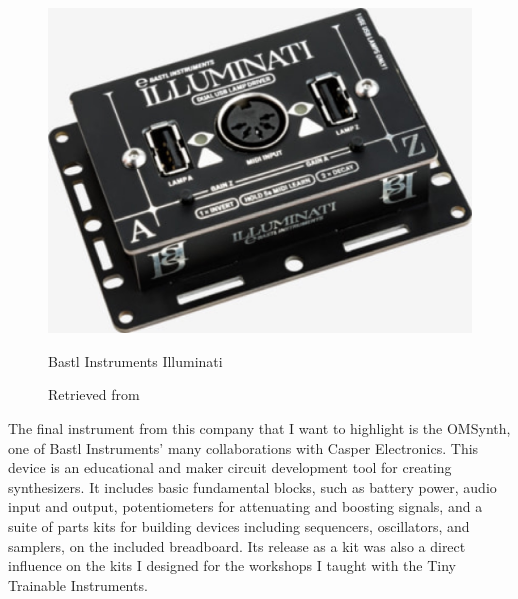 \begin{figure}[ht]
  \centering
  \includegraphics[width=0.75\linewidth,height=0.25\textheight,keepaspectratio]{images/bastl-illuminati.jpg}
  \caption{Bastl Instruments Illuminati}
  \caption*{Retrieved from \cite{website-bastl-instruments-current}}
  \label{fig:bastl-illuminati}
\end{figure}

The final instrument from this company that I want to highlight is the OMSynth, one of Bastl Instruments' many collaborations with Casper Electronics. This device is an educational and maker circuit development tool for creating synthesizers. It includes basic fundamental blocks, such as battery power, audio input and output, potentiometers for attenuating and boosting signals, and a suite of parts kits for building devices including sequencers, oscillators, and samplers, on the included breadboard. Its release as a kit was also a direct influence on the kits I designed for the workshops I taught with the Tiny Trainable Instruments.

